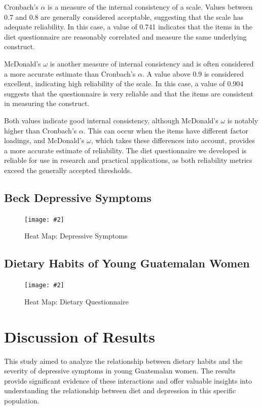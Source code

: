 \documentclass[jou]{apa7}
\newcommand{\includegraphicsmax}[2][]{%
	\texttt{[image: \#2]}%
}
\begin{document}
Cronbach's $\alpha$ is a measure of the internal consistency of a scale. Values between 0.7 and 0.8 are generally considered acceptable, suggesting that the scale has adequate reliability. In this case, a value of 0.741 indicates that the items in the diet questionnaire are reasonably correlated and measure the same underlying construct.

McDonald's $\omega$ is another measure of internal consistency and is often considered a more accurate estimate than Cronbach's $\alpha$. A value above 0.9 is considered excellent, indicating high reliability of the scale. In this case, a value of 0.904 suggests that the questionnaire is very reliable and that the items are consistent in measuring the construct.

Both values indicate good internal consistency, although McDonald's $\omega$ is notably higher than Cronbach's $\alpha$. This can occur when the items have different factor loadings, and McDonald's $\omega$, which takes these differences into account, provides a more accurate estimate of reliability. The diet questionnaire we developed is reliable for use in research and practical applications, as both reliability metrics exceed the generally accepted thresholds.


\subsection{Beck Depressive Symptoms}
\begin{figure}[H]
	\centering
	\includegraphicsmax{sintomasDepresivosBeckGraph.pdf}
	\caption{Heat Map: Depressive Symptoms}
	\label{fig:Figure2}
\end{figure}
\vspace{-1em} %

\subsection{Dietary Habits of Young Guatemalan Women}
\begin{figure}[H]
	\centering
	\includegraphicsmax{dietGraph.pdf}
	\caption{Heat Map: Dietary Questionnaire}
	\label{fig:Figure3}
\end{figure}

\section{Discussion of Results}\label{discusiuxf3n-de-resultados}

This study aimed to analyze the relationship between dietary habits and the severity of depressive symptoms in young Guatemalan women. The results provide significant evidence of these interactions and offer valuable insights into understanding the relationship between diet and depression in this specific population.
\end{document}
